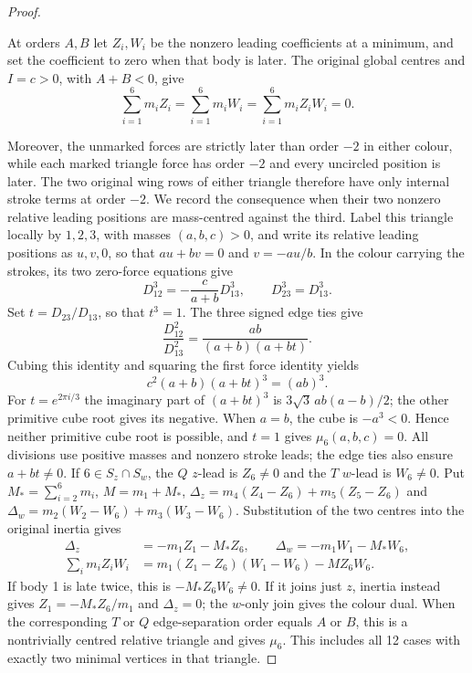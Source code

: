 \documentclass[11pt]{amsart}
\theoremstyle{remark}
\begin{document}
\begin{proof}
\begin{center}
\end{center}

At orders $A,B$ let $Z_i,W_i$ be the nonzero leading
coefficients at a minimum, and set the coefficient to zero
when that body is later. The original global centres and
$I=c>0$, with $A+B<0$, give
\begin{equation}\label{eq:no8-leading-centres}\sum_{i=1}^6m_iZ_i=\sum_{i=1}^6m_iW_i=\sum_{i=1}^6m_iZ_iW_i=0.\end{equation}

Moreover, the unmarked forces are strictly later than order $-2$ in either colour, while each marked triangle force has order $-2$ and every uncircled position is later. The two original wing rows of either triangle therefore have only internal stroke terms at order $-2$. We record the consequence when their two nonzero relative leading positions are mass-centred against the third. Label this triangle locally by $1,2,3$, with masses $(a,b,c)>0$, and write its relative leading positions as $u,v,0$, so that $au+bv=0$ and $v=-au/b$. In the colour carrying the strokes, its two zero-force equations give
\[
D_{12}^3=-\frac{c}{a+b}D_{13}^3,\qquad D_{23}^3=D_{13}^3.
\]
Set $t=D_{23}/D_{13}$, so that $t^3=1$. The three signed edge ties give
\[
\frac{D_{12}^2}{D_{13}^2}=\frac{ab}{(a+b)(a+bt)}.
\]
Cubing this identity and squaring the first force identity yields
\[
c^2(a+b)(a+bt)^3=(ab)^3.
\]
For $t=e^{2\pi i/3}$ the imaginary part of $(a+bt)^3$ is $3\sqrt3\,ab(a-b)/2$; the other primitive cube root gives its negative. When $a=b$, the cube is $-a^3<0$. Hence neither primitive cube root is possible, and $t=1$ gives $\mu_6(a,b,c)=0$. All divisions use positive masses and nonzero stroke leads; the edge ties also ensure $a+bt\ne0$.
If $6\in S_z\cap S_w$, the $Q$ $z$-lead is $Z_6\ne0$ and the $T$ $w$-lead is $W_6\ne0$. Put $M_* = \sum_{i=2}^6m_i$, $M=m_1+M_*$, $\Delta_z=m_4(Z_4-Z_6)+m_5(Z_5-Z_6)$ and $\Delta_w=m_2(W_2-W_6)+m_3(W_3-W_6)$. Substitution of the two centres into the original inertia gives
\begin{equation}\label{eq:no8-shared-six-inertia}
\begin{aligned}
\Delta_z&=-m_1Z_1-M_*Z_6,\qquad \Delta_w=-m_1W_1-M_*W_6,\\
\sum_i m_iZ_iW_i&=m_1(Z_1-Z_6)(W_1-W_6)-MZ_6W_6.
\end{aligned}
\end{equation}
If body 1 is late twice, this is $-M_*Z_6W_6\ne0$. If it joins just $z$, inertia instead gives $Z_1=-M_*Z_6/m_1$ and $\Delta_z=0$; the $w$-only join gives the colour dual. When the corresponding $T$ or $Q$ edge-separation order equals $A$ or $B$, this is a nontrivially centred relative triangle and gives $\mu_6$. This includes all 12 cases with exactly two minimal vertices in that triangle.


\end{proof}
\end{document}
